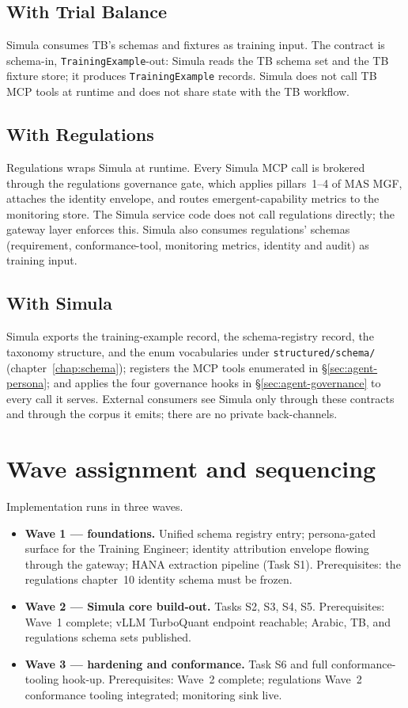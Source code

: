 \documentclass[12pt,a4paper,twoside]{report}
\begin{document}
\subsection{With Trial Balance}
Simula consumes TB's schemas and fixtures as training input. The
contract is schema-in, \texttt{TrainingExample}-out: Simula reads
the TB schema set and the TB fixture store; it produces
\texttt{TrainingExample} records. Simula does not call TB MCP tools
at runtime and does not share state with the TB workflow.

\subsection{With Regulations}
Regulations wraps Simula at runtime. Every Simula MCP call is
brokered through the regulations governance gate, which applies
pillars~1--4 of MAS MGF, attaches the identity envelope, and routes
emergent-capability metrics to the monitoring store. The Simula
service code does not call regulations directly; the gateway layer
enforces this. Simula also consumes regulations' schemas
(requirement, conformance-tool, monitoring metrics, identity and
audit) as training input.

\subsection{With Simula}
Simula exports the training-example record, the schema-registry
record, the taxonomy structure, and the enum vocabularies under
\texttt{structured/schema/} (chapter~\ref{chap:schema}); registers
the MCP tools enumerated in \S\ref{sec:agent-persona}; and applies
the four governance hooks in \S\ref{sec:agent-governance} to every
call it serves. External consumers see Simula only through these
contracts and through the corpus it emits; there are no private
back-channels.

\section{Wave assignment and sequencing}
\label{sec:agent-waves}
Implementation runs in three waves.

\begin{itemize}
\item \textbf{Wave 1 --- foundations.} Unified schema registry
entry; persona-gated surface for the Training Engineer;
identity attribution envelope flowing through the gateway; HANA
extraction pipeline (Task S1). Prerequisites: the regulations
chapter~10 identity schema must be frozen.
\item \textbf{Wave 2 --- Simula core build-out.} Tasks S2, S3, S4,
S5. Prerequisites: Wave~1 complete; vLLM TurboQuant endpoint
reachable; Arabic, TB, and regulations schema sets published.
\item \textbf{Wave 3 --- hardening and conformance.} Task S6 and
full conformance-tooling hook-up. Prerequisites: Wave~2
complete; regulations Wave~2 conformance tooling integrated;
monitoring sink live.
\end{itemize}
\end{document}
